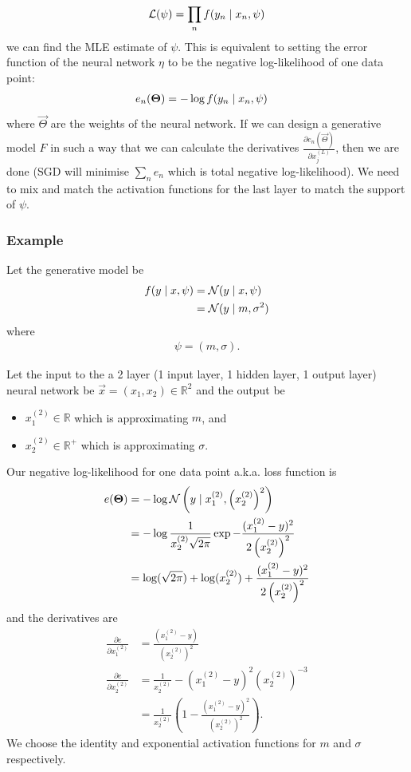 \begin{align}
    \mathcal L(\psi) = \prod_n f(y_n \mid x_n, \psi)
\end{align}
we can find the MLE estimate of $\psi$. This is equivalent to setting the error function of the neural network $\eta$ to be the negative log-likelihood of one data point:
\begin{align}
    e_n(\boldsymbol{\mathbf{\Theta}})    &= -\log f(y_n \mid x_n, \psi)
\end{align}
where $\vec \Theta$ are the weights of the neural network. If we can design a generative model $F$ in such a way that we can calculate the derivatives $\frac{\partial e_n(\vec \Theta)}{\partial x_j^{(L)}}$, then we are done (SGD will minimise $\sum_n e_n$ which is total negative log-likelihood). We need to mix and match the activation functions for the last layer to match the support of $\psi$.

\subsubsection{Example}
Let the generative model be
\begin{align}
    f(y \mid x, \psi) &= \operatorname{\mathcal N}(y \mid x, \psi) \\
                        &= \operatorname{\mathcal N}(y \mid m, \sigma^2)
\end{align}
where
\begin{align}
    \psi = (m, \sigma).
\end{align}

Let the input to the a 2 layer (1 input layer, 1 hidden layer, 1 output layer) neural network be $\vec x = (x_1, x_2) \in \mathbb R^2$ and the output be
\begin{itemize}
    \item $x_1^{(2)} \in \mathbb R$ which is approximating $m$, and
    \item $x_2^{(2)} \in \mathbb R^+$ which is approximating $\sigma$.
\end{itemize}

Our negative log-likelihood for one data point a.k.a. loss function is
\begin{align}
    e(\boldsymbol{\mathbf{\Theta}})  &= -\log\operatorname{\mathcal N}\left(y \mid x_1^{(2)}, \left(x_2^{(2)}\right)^2\right) \\
                    &= -\log \frac{1}{x_2^{(2)} \sqrt{2\pi}} \exp{-\frac{(x_1^{(2)} - y)^2}{2\left(x_2^{(2)}\right)^2}} \\
                    &= \log(\sqrt{2\pi}) + \log(x_2^{(2)}) + \frac{(x_1^{(2)} - y)^2}{2\left(x_2^{(2)}\right)^2}
\end{align}
and the derivatives are
\begin{align}
    \frac{\partial e}{\partial x_1^{(2)}}  &= \frac{\left(x_1^{(2)} - y\right)}{\left(x_2^{(2)}\right)^2} \\
    \frac{\partial e}{\partial x_2^{(2)}}  &= \frac{1}{x_2^{(2)}} - \left(x_1^{(2)} - y\right)^2\left(x_2^{(2)}\right)^{-3} \\
                                    &= \frac{1}{x_2^{(2)}}\left(1 - \frac{(x_1^{(2)} - y)^2}{\left(x_2^{(2)}\right)^2}\right).
\end{align}
We choose the identity and exponential activation functions for $m$ and $\sigma$ respectively.